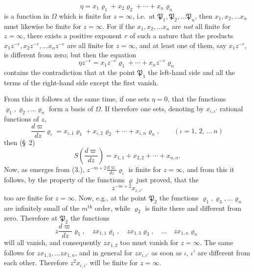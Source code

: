 \documentclass{article}
\begin{document}
\[ \eta = x_{1}\varrho_{1}+x_{2}\varrho_{2}+\cdots+x_{n}\varrho_{n} \]
is a function in $\Omega$ which is finite for $z = \infty$, i.e.\ at $\mathfrak{P}_{1}, \mathfrak{P}_{2}, \ldots \mathfrak{P}_{n}$, then $x_{1}, x_{2}, \ldots x_{n}$ must likewise be finite for $z = \infty$. For if the $x_{1}, x_{2}, \ldots x_{n}$ are \emph{not} all finite for $z = \infty$, there exists a positive exponent $r$ of such a nature that the products $x_{1}z^{-r}, x_{2}z^{-r}, \ldots x_{n}z^{-r}$ are all finite for $z = \infty$, and at least one of them, say $x_{1}z^{-r}$, is different from zero; but then the equation
\[ \eta z^{-r} = x_{1}z^{-r}\varrho_{1}+\cdots+x_{n}z^{-r}\varrho_{n} \]
contains the contradiction that at the point $\mathfrak{P}_{1}$ the left-hand side and all the terms of the right-hand side except the first vanish.


From this it follows at the same time, if one sets $\eta = 0$, that the functions $\varrho_{1}, \varrho_{2}, \ldots \varrho_{n}$ form a basis of $\Omega$. If therefore one sets, denoting by $x_{\iota,\iota'}$ rational functions of $z$,
\[ \frac{d\varpi}{dz}\varrho_{\iota} = x_{\iota,1}\varrho_{1}+x_{\iota,2}\varrho_{2}+\cdots+x_{\iota,n}\varrho_{n}, \qquad {\scriptstyle (\iota = 1,\, 2,\, \ldots\, n)} \tag{4.} \]
then (§~2)
\[ S\left(\frac{d\varpi}{dz}\right) = x_{1,1}+x_{2,2}+\cdots+x_{n,n}. \tag{5.} \]
Now, as emerges from (3.), $z^{-m+2}\frac{d\varpi}{dz}\varrho_{\iota}$ is finite for $z = \infty$, and from this it follows, by the property of the functions $\varrho$ just proved, that the
\[ z^{-m+2}x_{\iota,\iota'} \]
too are finite for $z = \infty$. Now, e.g., at the point $\mathfrak{P}_{2}$ the functions $\varrho_{1}, \varrho_{3}, \ldots \varrho_{n}$ are infinitely small of the $m^{\text{th}}$ order, while $\varrho_{2}$ is finite there and different from zero. Therefore at $\mathfrak{P}_{2}$ the functions
\[ z\frac{d\varpi}{dz}\varrho_{1}, \quad zx_{1,1}\varrho_{1}, \quad zx_{1,3}\varrho_{3}, \quad \ldots \quad zx_{1,n}\varrho_{n} \]
will all vanish, and consequently $zx_{1,2}$ too must vanish for $z = \infty$. The same follows for $zx_{1,3}, \ldots zx_{1,n}$, and in general for $zx_{\iota,\iota'}$ as soon as $\iota$, $\iota'$ are different from each other. Therefore $z^{2}x_{\iota,\iota'}$ will be finite for $z = \infty$.
\end{document}
